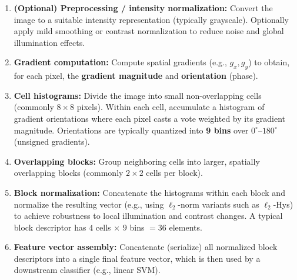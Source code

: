 {\begin{enumerate}

\item \textbf{(Optional) Preprocessing / intensity normalization:}
Convert the image to a suitable intensity representation (typically grayscale).
Optionally apply mild smoothing or contrast normalization to reduce noise and global illumination effects.

\item \textbf{Gradient computation:}
Compute spatial gradients (e.g., $g_x, g_y$) to obtain, for each pixel, the \textbf{gradient magnitude} and \textbf{orientation} (phase).

\item \textbf{Cell histograms:}
Divide the image into small non-overlapping cells (commonly $8 \times 8$ pixels).
Within each cell, accumulate a histogram of gradient orientations where each pixel casts a vote weighted by its gradient magnitude.
Orientations are typically quantized into \textbf{9 bins} over $0^\circ$--$180^\circ$ (unsigned gradients).

\item \textbf{Overlapping blocks:}
Group neighboring cells into larger, spatially overlapping blocks (commonly $2 \times 2$ cells per block).

\item \textbf{Block normalization:}
Concatenate the histograms within each block and normalize the resulting vector
(e.g., using $\ell_2$-norm variants such as $\ell_2$-Hys)
to achieve robustness to local illumination and contrast changes.
A typical block descriptor has $4$ cells $\times$ $9$ bins $= 36$ elements.

\item \textbf{Feature vector assembly:}
Concatenate (serialize) all normalized block descriptors into a single final feature vector,
which is then used by a downstream classifier (e.g., linear SVM).

\end{enumerate}}

